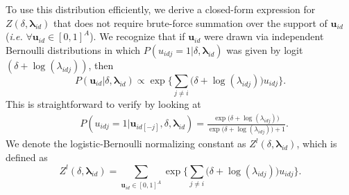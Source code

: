 \documentclass[twoside]{article}
\begin{document}
  	 To use this distribution efficiently, we derive a closed-form expression for $Z(\delta,\boldsymbol{\lambda}_{id})$ that does not require brute-force summation over the support of $\boldsymbol{u}_{id}$ (\textit{i.e.} $\forall \boldsymbol{u}_{id} \in [0,1]^A$). We recognize that if $\boldsymbol{u}_{id}$ were drawn via independent Bernoulli distributions in which $P({u}_{idj}=1|\delta, \boldsymbol{\lambda}_{id})$ was given by logit$(\delta+\log(\lambda_{idj}))$, then \begin{equation*}
  	 P(\boldsymbol{u}_{id}|\delta, \boldsymbol{\lambda}_{id}) \propto \exp\Big\{\sum_{j \neq i } \Big(\delta+\log(\lambda_{idj})\Big)u_{idj}\Big\}.  	 
  	 \end{equation*}
  	 This is straightforward to verify by looking at 
  	 \begin{equation*}
  	 \begin{aligned}
  &P(u_{idj}=1|\boldsymbol{u}_{id[-j]}, \delta, \boldsymbol{\lambda}_{id})
  	 =\frac{ \exp{\Big(\delta+\log(\lambda_{idj})\Big)}}{\exp{\Big(\delta+\log(\lambda_{idj})\Big)} + 1}.\end{aligned}\end{equation*}
  	 We denote the logistic-Bernoulli normalizing constant as $Z^{l}(\delta,\boldsymbol{\lambda}_{id})$, which is defined as 
  	 \begin{equation*}
  	 Z^{l}(\delta,\boldsymbol{\lambda}_{id})=\sum_{\boldsymbol{u}_{id} \in [0,1]^{A}} \exp\Big\{\sum_{j\neq i} \Big(\delta+\log(\lambda_{idj})\Big)u_{idj}\Big\}.
  	 \end{equation*}
  	 
\end{document}
